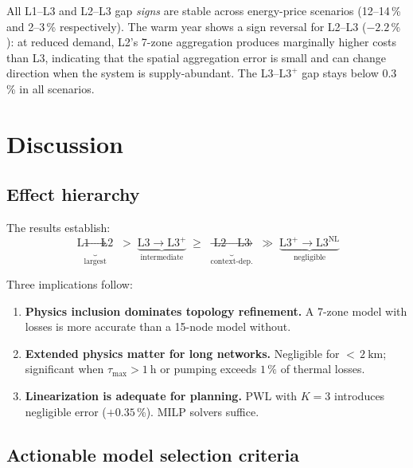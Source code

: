 \documentclass[review,3p]{elsarticle}
\newcommand{\Lplus}{\mathrm{L3}^{+}}
\newcommand{\Lnl}{\mathrm{L3}^{\mathrm{NL}}}
\begin{document}
All L1--L3 and L2--L3 gap \emph{signs} are stable across energy-price
scenarios (12--14\,\% and 2--3\,\% respectively). The warm year shows a
sign reversal for L2--L3 ($-2.2\,\%$): at reduced demand, L2's
7-zone aggregation produces marginally higher costs than L3, indicating
that the spatial aggregation error is small and can change direction
when the system is supply-abundant. The L3--$\Lplus$ gap stays below
0.3\,\% in all scenarios.

\section{Discussion}
\label{sec:discussion}

\subsection{Effect hierarchy}
\label{sec:disc_hierarchy}

The results establish:
%
\begin{equation*}
  \underbrace{\text{L1} \to \text{L2}}_{\text{largest}}
  \;>\;
  \underbrace{\text{L3} \to \Lplus}_{\text{intermediate}}
  \;\geq\;
  \underbrace{\text{L2} \to \text{L3}}_{\text{context-dep.}}
  \;\gg\;
  \underbrace{\Lplus \to \Lnl}_{\text{negligible}}
\end{equation*}

Three implications follow:
%
\begin{enumerate}
  \item \textbf{Physics inclusion dominates topology refinement.}
        A 7-zone model with losses is more accurate than a 15-node
        model without.
  \item \textbf{Extended physics matter for long networks.}
        Negligible for ${<}\,\SI{2}{\kilo\metre}$; significant when
        $\tau_{\max} > \SI{1}{\hour}$ or pumping exceeds
        $1\,\%$ of thermal losses.
  \item \textbf{Linearization is adequate for planning.}
        PWL with $K=3$ introduces negligible error ($+0.35$\,\%). MILP solvers
        suffice.
\end{enumerate}

\subsection{Actionable model selection criteria}
\label{sec:disc_criteria}
\end{document}

